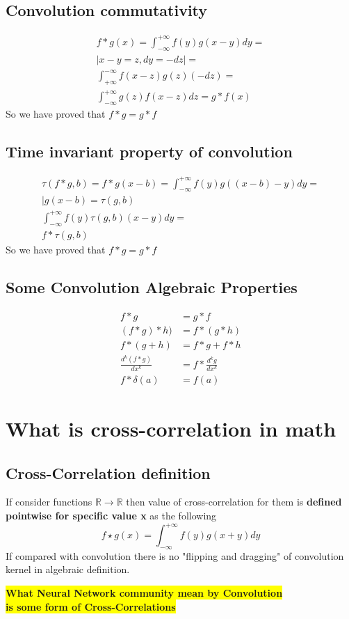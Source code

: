 \documentclass[12pt,a4paper]{article}
\theoremstyle{plain}
\begin{document}
\subsection{Convolution commutativity}
\begin{multline}\label{convolution_commutativity}
f*g(x)=\int^{+\infty}_{-\infty} f(y)g(x-y)dy=\\
|x-y=z,dy=-dz|=\\
\int^{-\infty}_{+\infty}  f(x-z)g(z)(-dz)=\\
\int^{+\infty}_{-\infty}  g(z)f(x-z)dz=g*f(x)
\end{multline}
So we have proved that $f*g=g*f$
\subsection{Time invariant property of convolution}
\begin{multline}\label{lti_convolution_property}
\tau(f*g,b)=f*g(x-b)=\int^{+\infty}_{-\infty} f(y)g((x-b)-y)dy=\\
|g(x-b)=\tau(g,b)\\
\int^{+\infty}_{-\infty}  f(y)\tau(g,b)(x-y)dy=\\
f*\tau(g,b)
\end{multline}
So we have proved that $f*g=g*f$
\subsection{Some Convolution Algebraic Properties}
\begin{align}
f*g&=g*f\\
(f*g)*h)&=f*(g*h)\\
f*(g+h)&=f*g+f*h\\
\frac{{d}^{k}{(f*g)}}{dx^k}&=f*\frac{{d}^{k}{g}}{dx^k}\\
f*\delta (a)&=f(a)
\end{align}
\section{What is cross-correlation in math}
\subsection{Cross-Correlation definition}
If consider functions $\mathbb{R} \to \mathbb{R}$ then value of cross-correlation for them is \textbf{defined pointwise for specific value x} as the following
\begin{equation}\label{cross-correlation}
f \star g(x)=\int^{+\infty}_{-\infty} f(y)g(x+y)dy
\end{equation}
If compared with convolution there is no "flipping and dragging" of convolution kernel in algebraic definition.
\begin{flushleft}
 \colorbox{yellow}{\textbf{What Neural Network community mean by Convolution}}\\
 \colorbox{yellow}{\textbf{is some form of Cross-Correlations}}
\end{flushleft}
\end{document}
